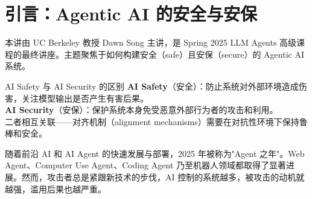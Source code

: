 \section{引言：Agentic AI 的安全与安保}

本讲由 UC Berkeley 教授 Dawn Song 主讲，是 Spring 2025 LLM Agents 高级课程的最终讲座。主题聚焦于如何构建安全（safe）且安保（secure）的 Agentic AI 系统。

\begin{knowledgebox}{AI Safety 与 AI Security 的区别}
\textbf{AI Safety}（安全）：防止系统对外部环境造成伤害，关注模型输出是否产生有害后果。\\
\textbf{AI Security}（安保）：保护系统本身免受恶意外部行为者的攻击和利用。\\
二者相互关联——对齐机制（alignment mechanisms）需要在对抗性环境下保持鲁棒和安全。
\end{knowledgebox}

随着前沿 AI 和 AI Agent 的快速发展与部署，2025 年被称为"Agent 之年"。Web Agent、Computer Use Agent、Coding Agent 乃至机器人领域都取得了显著进展。然而，攻击者总是紧跟新技术的步伐，AI 控制的系统越多，被攻击的动机就越强，滥用后果也越严重。

